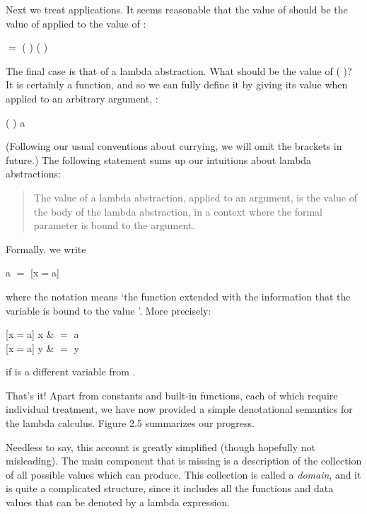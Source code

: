 Next we treat applications. It seems reasonable that the value of 
should be the value of  applied to the value of :
\begin{mlcoded}
     \tr{} $=$ ( \tr{}) ( \tr{})
\end{mlcoded}
The final case is that of a lambda abstraction. What should be the value of
( \tr{})? It is certainly a function, and so we can fully define it by
giving its value when applied to an arbitrary argument, :
\begin{mlcoded}
    ( \tr{}) a
\end{mlcoded}
(Following our usual conventions about currying, we will omit the brackets in
future.) The following statement sums up our intuitions about lambda
abstractions:
\begin{quote}
The value of a lambda abstraction, applied to an argument, is the value of
the body of the lambda abstraction, in a context where the formal
parameter is bound to the argument.
\end{quote}
Formally, we write
\begin{mlcoded}
     \tr{} a $=$  \tr{}[x$=$a]
\end{mlcoded}
where the notation \ml{(\tr{}[x=a])} means `the function \ml{(\tr{})} extended with the
information that the variable  is bound to the value '. More precisely:
\begin{mlalign}
    \tr{}[x$=$a] x & $=$ a \\
    \tr{}[x$=$a] y & $=$ \tr{} y
\end{mlalign}
if  is a different variable from .

That's it! Apart from constants and built-in functions, each of which require
individual treatment, we have now provided a simple denotational semantics
for the lambda calculus. Figure 2.5 summarizes our progress.

Needless to say, this account is greatly simplified (though hopefully not
misleading). The main component that is missing is a description of the
collection of all possible values which \eval{} can produce. This collection is
called a \textit{domain}, and it is quite a complicated structure, since it includes all the functions and data values that can be denoted by a lambda expression.

